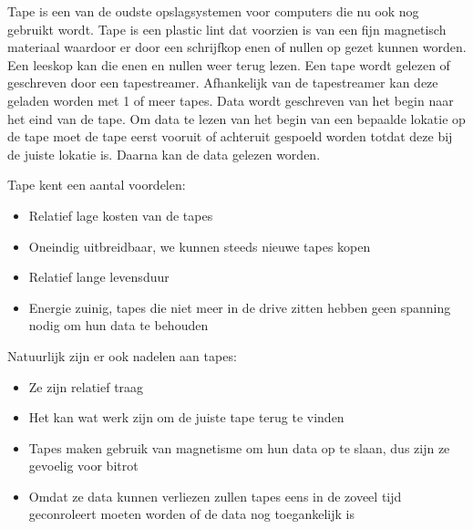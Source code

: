 Tape is een van de oudste opslagsystemen voor computers die nu ook nog gebruikt wordt. Tape is een plastic lint dat voorzien is van een fijn magnetisch materiaal waardoor er door een schrijfkop enen of nullen op gezet kunnen worden. Een leeskop kan die enen en nullen weer terug lezen. Een tape wordt gelezen of geschreven door een tapestreamer. Afhankelijk van de tapestreamer kan deze geladen worden met 1 of meer tapes. Data wordt geschreven van het begin naar het eind van de tape. Om data te lezen van het begin van een bepaalde lokatie op de tape moet de tape eerst vooruit of achteruit gespoeld worden totdat deze bij de juiste lokatie is. Daarna kan de data gelezen worden.

Tape kent een aantal voordelen:
\begin{itemize}
\item Relatief lage kosten van de tapes
\item Oneindig uitbreidbaar, we kunnen steeds nieuwe tapes kopen
\item Relatief lange levensduur
\item Energie zuinig, tapes die niet meer in de drive zitten hebben geen spanning nodig om hun data te behouden
\end{itemize}

Natuurlijk zijn er ook nadelen aan tapes:
\begin{itemize}
\item Ze zijn relatief traag
\item Het kan wat werk zijn om de juiste tape terug te vinden
\item Tapes maken gebruik van magnetisme om hun data op te slaan, dus zijn ze gevoelig voor bitrot
\item Omdat ze data kunnen verliezen zullen tapes eens in de zoveel tijd geconroleert moeten worden of de data nog toegankelijk is
\end{itemize}

